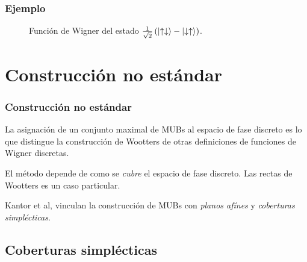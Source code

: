\documentclass[10pt, spanish]{beamer}
\begin{document}
  \begin{frame}
    \frametitle{Ejemplo}

    \begin{figure}[h]
      \centering
      \scalebox{0.6}{
        
      }
      \caption{Función de Wigner del estado
      $\frac{1}{\sqrt{2}} \left(
        \ket{\uparrow\downarrow} -
      \ket{\downarrow\uparrow}\right)$.}
      \label{fig:wigner-desargues-2-2-s2}
    \end{figure}
  \end{frame}

  \section{Construcción no estándar}

  \begin{frame}
    \frametitle{Construcción no estándar}

    La asignación de un conjunto maximal de MUBs al espacio
    de fase discreto es lo que distingue la construcción de
    Wootters de otras definiciones de funciones de Wigner
    discretas.

    \vspace{15pt}

    \pause

    El método depende de como se \textit{cubre} el espacio
    de fase discreto. Las rectas de Wootters es un caso
    particular.

    \vspace{15pt}

    Kantor et al, vinculan la construcción de MUBs con
    \textit{planos afínes} y \textit{coberturas
    simplécticas}.
  \end{frame}

  

  \subsection{Coberturas simplécticas}
\end{document}
